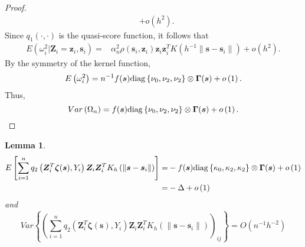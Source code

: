 \documentclass[authoryear,review, 12pt]{elsarticle}
\newtheorem{lem}{Lemma}
\begin{document}
\begin{proof}
\begin{align*}
 & +o\left(h^{2}\right).
\end{align*}
Since $q_{1}\left(\cdot,\cdot\right)$ is the quasi-score function,
it follows that 
\begin{align*}
E\left(\omega_{i}^{2}|\bm{Z}_{i}=\bm{z}_{i},\bm{s}_{i}\right)= & \alpha_{n}^{2}\rho(\bm{s}_{i},\bm{z}_{i})\bm{z}_{i}\bm{z}_{i}^{T}K\left(h^{-1}\|\bm{s}-\bm{s}_{i}\|\right)+o\left(h^{2}\right).
\end{align*}
By the symmetry of the kernel function,
\[
E\left(\omega_{i}^{2}\right)=n^{-1}f(\bm{s}){\rm diag}\left\{ \nu_{0},\nu_{2},\nu_{2}\right\} \otimes\bm{\Gamma}(\bm{s})+o\left(1\right).
\]
Thus, 
\[
Var\left(\Omega_{n}\right)=f(\bm{s}){\rm diag}\left\{ \nu_{0},\nu_{2},\nu_{2}\right\} \otimes\bm{\Gamma}(\bm{s})+o\left(1\right).
\]
\end{proof}
\begin{lem}
\label{lemma:delta}
\begin{align*}
E\left[\sum_{i=1}^{n}q_{2}\left(\bm{Z}_{i}^{T}\bm{\zeta}(\bm{s}),Y_{i}\right)\bm{Z}_{i}\bm{Z}_{i}^{T}K_{h}\left(\|\bm{s}-\bm{s}_{i}\|\right)\right]= & -f(\bm{s}){\rm diag}\left\{ \kappa_{0},\kappa_{2},\kappa_{2}\right\} \otimes\bm{\Gamma}(\bm{s})+o\left(1\right)\\
= & -\Delta+o\left(1\right)
\end{align*}
and
\[
Var\left\{ \left(\sum_{i=1}^{n}q_{2}\left(\bm{Z}_{i}^{T}\bm{\zeta}(\bm{s}),Y_{i}\right)\bm{Z}_{i}\bm{Z}_{i}^{T}K_{h}\left(\|\bm{s}-\bm{s}_{i}\|\right)\right)_{ij}\right\} =O\left(n^{-1}h^{-2}\right)
\]
\end{lem}
\end{document}
